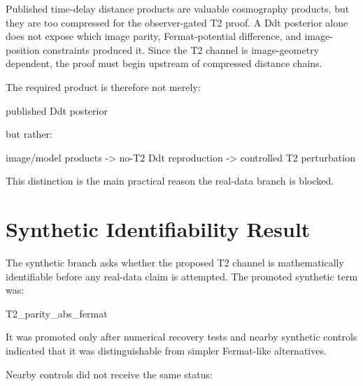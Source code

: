 \documentclass[11pt]{article}
\newenvironment{Shaded}{}{}
\newcommand{\NormalTok}[1]{#1}
\begin{document}
Published time-delay distance products are valuable cosmography
products, but they are too compressed for the observer-gated T2 proof. A
Ddt posterior alone does not expose which image parity, Fermat-potential
difference, and image-position constraints produced it. Since the T2
channel is image-geometry dependent, the proof must begin upstream of
compressed distance chains.

The required product is therefore not merely:

\begin{Shaded}
\begin{Highlighting}[]
\NormalTok{published Ddt posterior}
\end{Highlighting}
\end{Shaded}

but rather:

\begin{Shaded}
\begin{Highlighting}[]
\NormalTok{image/model products {-}\textgreater{} no{-}T2 Ddt reproduction {-}\textgreater{} controlled T2 perturbation}
\end{Highlighting}
\end{Shaded}

This distinction is the main practical reason the real-data branch is
blocked.

\section{Synthetic Identifiability
Result}\label{synthetic-identifiability-result}

The synthetic branch asks whether the proposed T2 channel is
mathematically identifiable before any real-data claim is attempted. The
promoted synthetic term was:

\begin{Shaded}
\begin{Highlighting}[]
\NormalTok{T2\_parity\_abs\_fermat}
\end{Highlighting}
\end{Shaded}

It was promoted only after numerical recovery tests and nearby synthetic
controls indicated that it was distinguishable from simpler Fermat-like
alternatives.

Nearby controls did not receive the same status:
\end{document}
